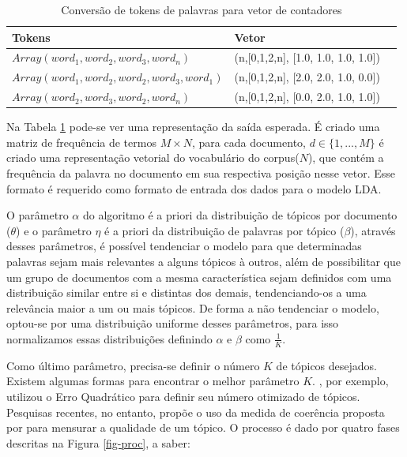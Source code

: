 \documentclass[12pt,a4paper]{article}
\begin{document}
\begin{table}[h]
  \centering
  \begin{tabular}{l l l}
  Tokens		&Vetor &\\
  \hline
  $Array(word_1, word_2, word_3, word_n)$						&(n,[0,1,2,n], [1.0, 1.0, 1.0, 1.0]) &\\
  $Array(word_1, word_2, word_2, word_3, word_1)$				&(n,[0,1,2,n], [2.0, 2.0, 1.0, 0.0]) &\\
  $Array(word_2, word_3, word_2, word_n)$						&(n,[0,1,2,n], [0.0, 2.0, 1.0, 1.0]) &\\
  \hline
  \end{tabular}
  
  \caption{Conversão de tokens de palavras para vetor de contadores}
  \label{tab-voc}
\end{table}


Na Tabela \ref{tab-voc} pode-se ver uma representação da saída esperada. É criado uma matriz de frequência de termos $M \times N$, para cada documento,
 $d \in \{1,. . . , M\}$ é criado uma representação vetorial do vocabulário do corpus($N$), que contém a frequência da palavra no documento em sua respectiva posição nesse vetor.
 Esse formato é requerido como formato de entrada dos dados para o modelo LDA.

O parâmetro $\alpha$ do algoritmo é a priori da distribuição de tópicos por documento ($\theta$) e o parâmetro $\eta$ é a priori da distribuição de palavras por tópico ($\beta$),
 através desses parâmetros, é possível tendenciar o modelo para que determinadas palavras sejam mais relevantes a alguns tópicos à outros,
 além de possibilitar que um grupo de documentos com a mesma característica sejam definidos com uma distribuição similar entre si e distintas dos demais,
 tendenciando-os a uma relevância maior a um ou mais tópicos. De forma a não tendenciar o modelo, optou-se por uma distribuição uniforme desses parâmetros,
 para isso normalizamos essas distribuições definindo $\alpha$ e $\beta$ como $\frac{1}{K}$.

Como último parâmetro, precisa-se definir o número $K$ de tópicos desejados. Existem algumas formas para encontrar o melhor parâmetro $K$.  , por exemplo, utilizou o Erro Quadrático para definir seu número otimizado de tópicos. Pesquisas recentes, no entanto,
 propõe o uso da medida de coerência proposta por  para mensurar a qualidade de um tópico. O processo é dado por quatro fases descritas na Figura \ref{fig-proc}, a saber:
\end{document}
